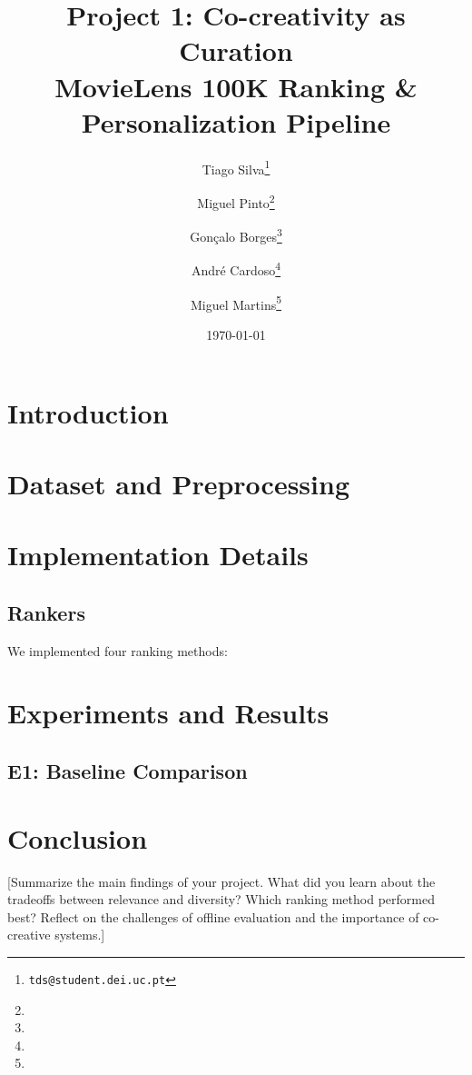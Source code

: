 \documentclass[11pt]{article}
\title{\textbf{Project 1: Co-creativity as Curation} \\
\large MovieLens 100K Ranking \& Personalization Pipeline}
\author{
Tiago Silva\thanks{\texttt{tds@student.dei.uc.pt}}
\and
Miguel Pinto\thanks{\texttt{}}
\and
Gonçalo Borges\thanks{\texttt{}}
\and
André Cardoso\thanks{\texttt{}}
\and
Miguel Martins\thanks{\texttt{}}
}
\date{\today}
\begin{document}
\maketitle

\begin{abstract}

\end{abstract}

\section{Introduction}
\label{sec:introduction}

\section{Dataset and Preprocessing}
\label{sec:dataset}


\section{Implementation Details}
\label{sec:implementation}

\subsection{Rankers}
We implemented four ranking methods:



\section{Experiments and Results}
\label{sec:experiments}

\subsection{E1: Baseline Comparison}
\label{sec:e1}



\section{Conclusion}
\label{sec:conclusion}

[Summarize the main findings of your project. What did you learn about the tradeoffs between relevance and diversity? Which ranking method performed best? Reflect on the challenges of offline evaluation and the importance of co-creative systems.]
\end{document}
